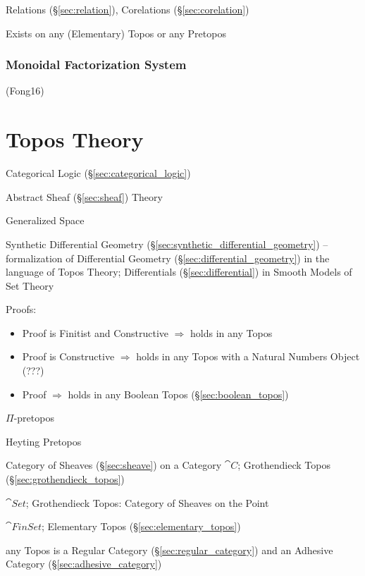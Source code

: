 Relations (\S\ref{sec:relation}), Corelations (\S\ref{sec:corelation})

Exists on any (Elementary) Topos or any Pretopos %



\subsubsection{Monoidal Factorization System}
\label{sec:monoidal_factorization_system}

(Fong16)



\section{Topos Theory}\label{sec:topos_theory}

Categorical Logic (\S\ref{sec:categorical_logic})

Abstract Sheaf (\S\ref{sec:sheaf}) Theory

Generalized Space

\fist Synthetic Differential Geometry
(\S\ref{sec:synthetic_differential_geometry}) -- formalization of Differential
Geometry (\S\ref{sec:differential_geometry}) in the language of Topos Theory;
Differentials (\S\ref{sec:differential}) in Smooth Models of Set Theory

Proofs:
\begin{itemize}
  \item Proof is Finitist and Constructive $\Rightarrow$ holds in any
    Topos
  \item Proof is Constructive $\Rightarrow$ holds in any Topos with a
    Natural Numbers Object (???)
  \item Proof $\Rightarrow$ holds in any Boolean Topos
    (\S\ref{sec:boolean_topos})
\end{itemize}

$\Pi$-pretopos

Heyting Pretopos

Category of Sheaves (\S\ref{sec:sheave}) on a Category $\cat{C}$;
Grothendieck Topos (\S\ref{sec:grothendieck_topos})

$\cat{Set}$; Grothendieck Topos: Category of Sheaves on the Point

$\cat{FinSet}$; Elementary Topos (\S\ref{sec:elementary_topos})

any Topos is a Regular Category (\S\ref{sec:regular_category}) and an
Adhesive Category (\S\ref{sec:adhesive_category})



